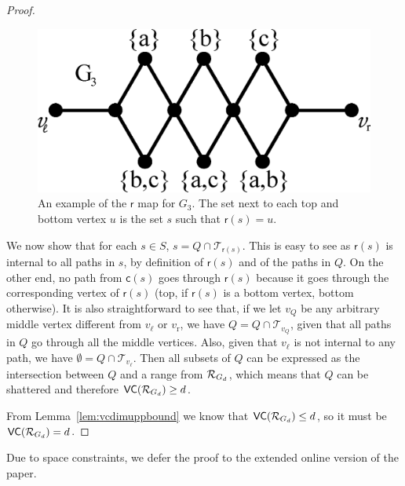 \begin{proof}
  \begin{figure}[ht]
    \centering
    \includegraphics[scale=0.4]{tight-mapexample}
    \caption{An example of the $\mathsf{r}$ map for $G_3$. The set next to
    each top and bottom vertex $u$ is the set $s$ such that $\mathsf{r}(s)=u$.}
    \label{fig:mapexample}
  \end{figure}
  
  We now show that for each $s\in S$, $s=Q\cap\mathcal{T}_{\mathsf{r}(s)}$. This
  is easy to see as $\mathsf{r}(s)$ is internal to all paths in $s$, by
  definition of $\mathsf{r}(s)$ and of the paths in $Q$. On the other end, no
  path from $\mathsf{c}(s)$ goes through $\mathsf{r}(s)$ because it goes through
  the corresponding vertex of $\mathsf{r}(s)$ (top, if $\mathsf{r}(s)$ is a
  bottom vertex, bottom otherwise). It is also straightforward to see that,
  if we let $v_Q$ be any arbitrary middle vertex different from $v_\ell$
  or $v_\mathrm{r}$, we have $Q=Q\cap\mathcal{T}_{v_Q}$, given that all paths in
  $Q$ go through all the middle vertices. Also, given that $v_\ell$ is not
  internal to any path, we have $\emptyset=Q\cap\mathcal{T}_{v_\ell}$. Then all
  subsets of $Q$ can be expressed as the intersection between $Q$ and a range
  from $\mathcal{R}_{G_d}$, which means that $Q$ can be shattered and therefore
  $\mathsf{VC}(\mathcal{R}_{G_d})\ge d$.

  From Lemma~\ref{lem:vcdimuppbound} we know that $\mathsf{VC}(\mathcal{R}_{G_d})\le d$, so
  it must be $\mathsf{VC}(\mathcal{R}_{G_d})=d$.
\end{proof}
\else
Due to space constraints, we defer the proof to the extended online version of
the paper.
\fi


